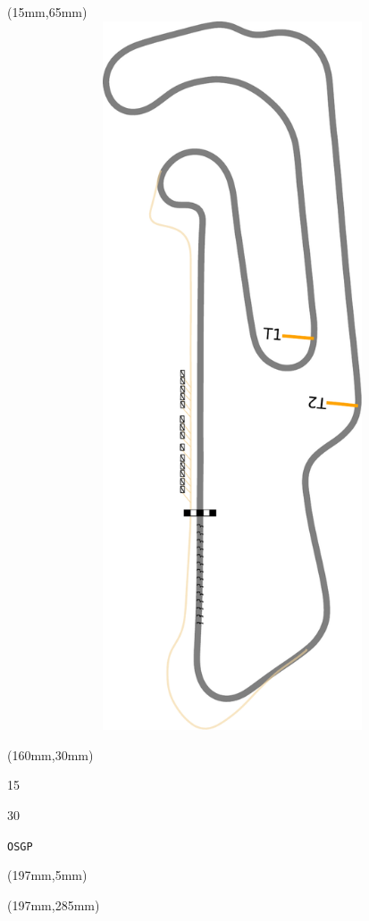 \begin{textblock*}{185mm}(15mm,65mm)%
\centering
\mbox{\includegraphics[width=185mm,height=210mm,keepaspectratio]{PT/OSGP.pdf}}
\end{textblock*}
\begin{textblock*}{40mm}(160mm,30mm)%
\Large
\par{} 
\par15 
\par30 
\par\hfill\tiny\tt OSGP\\
\end{textblock*}
\begin{textblock*}{20mm}(197mm,5mm)%
\fbox{\thepage}
\label{OSGP}
\end{textblock*}
\begin{textblock*}{20mm}(197mm,285mm)%
\fbox{\thepage}
\end{textblock*}


